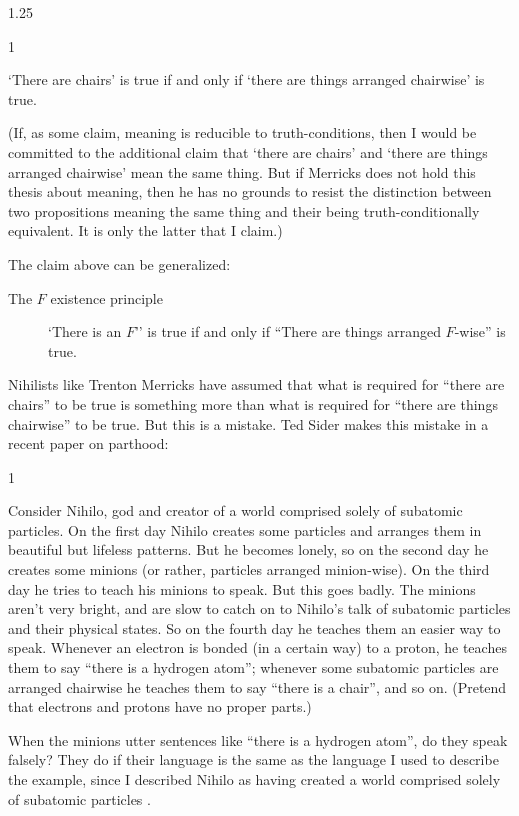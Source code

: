 \documentclass[11pt]{article}
\newenvironment{squote}{%
\begin{spacing}{1}
       	\begin{list}{}{%
\setlength{\labelwidth}{0pt}%
\rightmargin\leftmargin%
}
\item\relax
}{%
\end{list}%
\end{spacing}
}
\begin{document}
\begin{spacing}{1.25}
\begin{squote}
`There are chairs' is true if and only if `there are things arranged
  chairwise' is true.
\end{squote}

(If, as some claim, meaning is reducible to truth-conditions, then I
would be committed to the additional claim that `there are chairs' and
`there are things arranged chairwise' mean the same thing.  But if
Merricks does not hold this thesis about meaning, then he has no
grounds to resist the distinction between two propositions meaning the
same thing and their being truth-conditionally equivalent.  It is only
the latter that I claim.)

The claim above can be generalized:

\begin{description}
  \item[The $F$ existence principle] `There is an $F$'' is true if
    and only if ``There are things arranged $F$-wise'' is
    true. \label{fwise}
\end{description}

Nihilists like Trenton Merricks have assumed that what is required for
``there are chairs'' to be true is something more than what is
required for ``there are things chairwise'' to be true.  But this is a
mistake.  Ted Sider makes this mistake in a recent paper on parthood:

\begin{squote}
Consider Nihilo, god and creator of a world comprised solely of
subatomic particles.  On the first day Nihilo creates some particles
and arranges them in beautiful but lifeless patterns.  But he becomes
lonely, so on the second day he creates some minions (or rather,
particles arranged minion-wise).  On the third day he tries to teach
his minions to speak.  But this goes badly.  The minions aren't very
bright, and are slow to catch on to Nihilo's talk of subatomic
particles and their physical states.  So on the fourth day he teaches
them an easier way to speak.  Whenever an electron is bonded (in a
certain way) to a proton, he teaches them to say ``there is a hydrogen
atom''; whenever some subatomic particles are arranged chairwise he
teaches them to say ``there is a chair'', and so on.  (Pretend that
electrons and protons have no proper parts.)

When the minions utter sentences like ``there is a hydrogen atom'', do
they speak falsely?  They do if their language is the same as the
language I used to describe the example, since I described Nihilo as
having created a world comprised solely of subatomic particles
\citeyearpar[7]{sider2011c}.
\end{squote}


\end{spacing}
\end{document}
